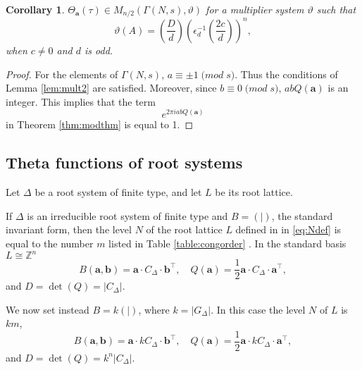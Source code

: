 \documentclass[11pt,a4paper]{amsart}
\newtheorem{corollary}[theorem]{Corollary}
\theoremstyle{definition}
\newcommand{\SZ}{\mathbb{Z}}                    %
\begin{document}
\begin{corollary}
		\label{cor:mult3} 
$\Theta_{\mathbf{a}}(\tau) \in M_{n/2}(\Gamma(N,s), \vartheta)$
for a multiplier system $\vartheta$ such that
\[ \vartheta(A)= \left(\frac{D}{d}\right)\left(\epsilon^{-1}_d \left(\frac{2c}{d}\right)\right)^n, \]
when $c \neq 0$ and $d$ is odd.
\end{corollary}
\begin{proof}
For the elements of $\Gamma(N,s)$, $a \equiv \pm 1 \; \mathrm(mod\; s)$. Thus the conditions of Lemma \ref{lem:mult2} are satisfied. Moreover, since $b \equiv 0 \; \mathrm(mod\; s)$, $ab Q(\mathbf{a})$ is an integer. This implies that the term 
\[ e^{2 \pi i ab Q(\mathbf{a})} \]
in Theorem \ref{thm:modthm} is equal to 1.
\end{proof}


\subsection{Theta functions of root systems}

Let $\Delta$  be a root system of finite type, and let $L$ be its root lattice. 

If $\Delta$ is an irreducible root system of finite type and $B=(|)$, the standard invariant form, then the level $N$ of the root lattice $L$ defined in in \eqref{eq:Ndef} is equal to the number $m$ listed in Table \ref{table:congorder} \cite[page 261]{kac1994infinite}. In the standard basis  $L\cong \SZ^n$
\[ B(\mathbf{a},\mathbf{b})=\mathbf{a}\cdot C_{\Delta} \cdot \mathbf{b}^{\top}, \quad Q(\mathbf{a})=\frac{1}{2}\mathbf{a}\cdot C_{\Delta} \cdot \mathbf{a}^{\top}, \]
and $D=\det(Q)=|C_{\Delta}|$.


We now set instead $B=k(|)$, where $k=|G_{\Delta}|$. In this case the level $N$ of $L$ is $km$,
\[ B(\mathbf{a},\mathbf{b})=\mathbf{a}\cdot kC_{\Delta} \cdot \mathbf{b}^{\top}, \quad Q(\mathbf{a})=\frac{1}{2}\mathbf{a}\cdot kC_{\Delta} \cdot \mathbf{a}^{\top}, \]
and $D=\det(Q)=k^n|C_{\Delta}|$.






\end{document}
